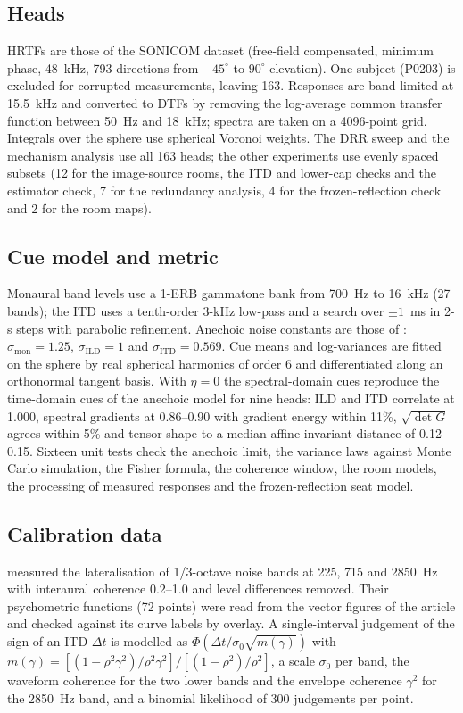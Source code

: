 \documentclass[11pt]{article}
\begin{document}
\subsection{Heads}
HRTFs are those of the SONICOM dataset \citep{engel2023} (free-field compensated, minimum phase, 48~kHz, 793 directions from $-45^\circ$ to $90^\circ$ elevation). One subject (P0203) is excluded for corrupted measurements, leaving 163. Responses are band-limited at 15.5~kHz and converted to DTFs by removing the log-average common transfer function between 50~Hz and 18~kHz; spectra are taken on a 4096-point grid. Integrals over the sphere use spherical Voronoi weights. The DRR sweep and the mechanism analysis use all 163 heads; the other experiments use evenly spaced subsets (12 for the image-source rooms, the ITD and lower-cap checks and the estimator check, 7 for the redundancy analysis, 4 for the frozen-reflection check and 2 for the room maps).

\subsection{Cue model and metric}
Monaural band levels use a 1-ERB gammatone bank from 700~Hz to 16~kHz (27 bands); the ITD uses a tenth-order 3-kHz low-pass and a search over $\pm1$~ms in 2-\textmu s steps with parabolic refinement. Anechoic noise constants are those of \citet{bassett2026}: $\sigma_{\mathrm{mon}}=1.25$, $\sigma_{\mathrm{ILD}}=1$ and $\sigma_{\mathrm{ITD}}=0.569$. Cue means and log-variances are fitted on the sphere by real spherical harmonics of order 6 and differentiated along an orthonormal tangent basis. With $\eta=0$ the spectral-domain cues reproduce the time-domain cues of the anechoic model for nine heads: ILD and ITD correlate at 1.000, spectral gradients at 0.86--0.90 with gradient energy within 11\%, $\sqrt{\det G}$ agrees within 5\% and tensor shape to a median affine-invariant distance of 0.12--0.15. Sixteen unit tests check the anechoic limit, the variance laws against Monte Carlo simulation, the Fisher formula, the coherence window, the room models, the processing of measured responses and the frozen-reflection seat model.

\subsection{Calibration data}
\citet{rakerd2010} measured the lateralisation of 1/3-octave noise bands at 225, 715 and 2850~Hz with interaural coherence 0.2--1.0 and level differences removed. Their psychometric functions (72 points) were read from the vector figures of the article and checked against its curve labels by overlay. A single-interval judgement of the sign of an ITD $\Delta t$ is modelled as $\Phi(\Delta t/\sigma_0\sqrt{m(\gamma)})$ with $m(\gamma)=[(1-\rho^2\gamma^2)/\rho^2\gamma^2]/[(1-\rho^2)/\rho^2]$, a scale $\sigma_0$ per band, the waveform coherence for the two lower bands and the envelope coherence $\gamma^2$ for the 2850~Hz band, and a binomial likelihood of 300 judgements per point.
\end{document}
